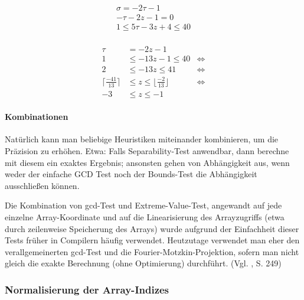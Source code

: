 \begin{align}
\sigma = -2 \tau - 1 \\
- \tau - 2z - 1 = 0 \\
1 \leq 5 \tau - 3 z + 4 \leq 40 \\
\end{align}

\begin{align}
 \tau & = -2z -1  & \\
1      & \leq -13z - 1  \leq 40 & \Leftrightarrow \\
2      & \leq -13z       \leq 41 & \Leftrightarrow \\
\lceil \frac{-41}{13} \rceil & \leq z  \leq \lfloor \frac{-2}{13} \rfloor & \Leftrightarrow \\
-3 & \leq z  \leq -1 &
\end{align}






\paragraph{Kombinationen}

Natürlich kann man beliebige Heuristiken miteinander kombinieren, um
die Präzision zu erhöhen. Etwa: Falls Separability-Test anwendbar,
dann berechne mit diesem ein exaktes Ergebnis; ansonsten gehen von
Abhängigkeit aus, wenn weder der einfache GCD Test noch der
Bounds-Test die Abhängigkeit ausschließen können.

Die Kombination von gcd-Test und Extreme-Value-Test, angewandt auf jede
einzelne Array-Koordinate und auf die Linearisierung des Arrayzugriffs
(etwa durch zeilenweise Speicherung des Arrays) wurde aufgrund der
Einfachheit dieser Tests früher in Compilern häufig
verwendet. Heutzutage verwendet man eher den verallgemeinerten gcd-Test
und die Fourier-Motzkin-Projektion, sofern man nicht gleich die exakte
Berechnung (ohne Optimierung) durchführt. (Vgl. \cite{Wol95}, S. 249)



\def\ins{\hspace{.5cm}}


\subsubsection{Normalisierung der Array-Indizes}

